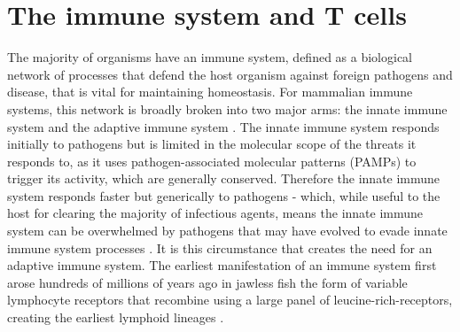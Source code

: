 \section{The immune system and T cells}
The majority of organisms have an immune system, defined as a biological network of processes that defend the host organism against foreign pathogens and disease, that is vital for maintaining homeostasis. For mammalian immune systems, this network is broadly broken into two major arms: the innate immune system and the adaptive immune system \cite{Dempsey2003}. The innate immune system responds initially to pathogens but is limited in the molecular scope of the threats it responds to, as it uses pathogen-associated molecular patterns (PAMPs) to trigger its activity, which are generally conserved. Therefore the innate immune system responds faster but generically to pathogens - which, while useful to the host for clearing the majority of infectious agents, means the innate immune system can be overwhelmed by pathogens that may have evolved to evade innate immune system processes \cite{Dempsey2003}. It is this circumstance that creates the need for an adaptive immune system. The earliest manifestation of an immune system first arose hundreds of millions of years ago in jawless fish the form of variable lymphocyte receptors that recombine using a large panel of leucine-rich-receptors, creating the earliest lymphoid lineages \cite{Flajnik2010}.

